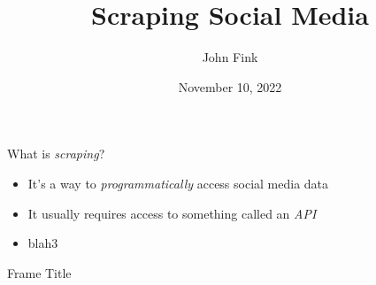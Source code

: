 \documentclass{beamer}
\title{Scraping Social Media}
\author{John Fink}
\date{November 10, 2022}
\begin{document}
\begin{frame}[plain]
    \maketitle
\end{frame} 
\begin{frame}{What is \textit{scraping}?}
	\begin{itemize}
		\pause
		\item It's a way to \textit{programmatically} access social media data
		\pause
		\item It usually requires access to something called an \textit{API}
		\pause
		\item blah3
	\end{itemize}
\end{frame}
\begin{frame}{Frame Title}
\end{frame}
\end{document}
